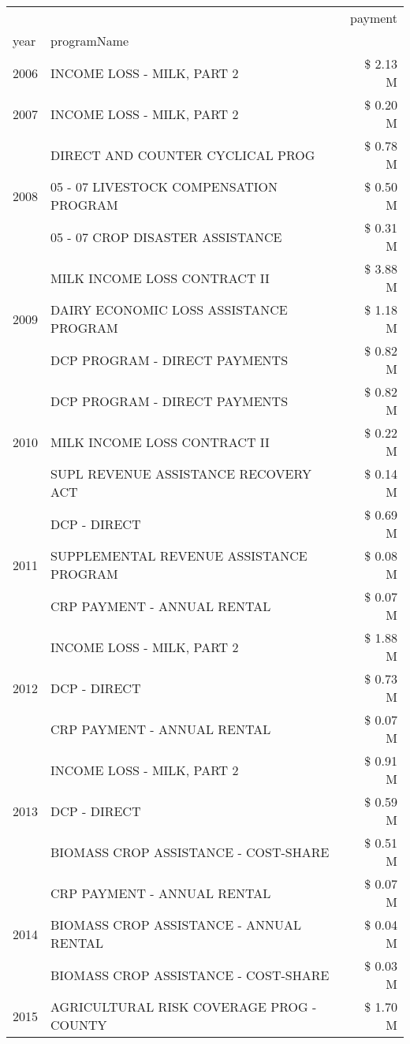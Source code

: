 \begin{tabular}{llr}
\toprule
 &  & payment \\
year & programName &  \\
\midrule
2006 & INCOME LOSS - MILK, PART 2 & \$ 2.13 M \\
\cline{1-3}
2007 & INCOME LOSS - MILK, PART 2 & \$ 0.20 M \\
\cline{1-3}
\multirow[t]{3}{*}{2008} & DIRECT AND COUNTER CYCLICAL PROG & \$ 0.78 M \\
 & 05 - 07 LIVESTOCK COMPENSATION PROGRAM & \$ 0.50 M \\
 & 05 - 07 CROP DISASTER ASSISTANCE & \$ 0.31 M \\
\cline{1-3}
\multirow[t]{3}{*}{2009} & MILK INCOME LOSS CONTRACT II & \$ 3.88 M \\
 & DAIRY ECONOMIC LOSS ASSISTANCE PROGRAM & \$ 1.18 M \\
 & DCP PROGRAM - DIRECT PAYMENTS & \$ 0.82 M \\
\cline{1-3}
\multirow[t]{3}{*}{2010} & DCP PROGRAM - DIRECT PAYMENTS & \$ 0.82 M \\
 & MILK INCOME LOSS CONTRACT II & \$ 0.22 M \\
 & SUPL REVENUE ASSISTANCE RECOVERY ACT & \$ 0.14 M \\
\cline{1-3}
\multirow[t]{3}{*}{2011} & DCP - DIRECT & \$ 0.69 M \\
 & SUPPLEMENTAL REVENUE ASSISTANCE PROGRAM & \$ 0.08 M \\
 & CRP PAYMENT - ANNUAL RENTAL & \$ 0.07 M \\
\cline{1-3}
\multirow[t]{3}{*}{2012} & INCOME LOSS - MILK, PART 2 & \$ 1.88 M \\
 & DCP - DIRECT & \$ 0.73 M \\
 & CRP PAYMENT - ANNUAL RENTAL & \$ 0.07 M \\
\cline{1-3}
\multirow[t]{3}{*}{2013} & INCOME LOSS - MILK, PART 2 & \$ 0.91 M \\
 & DCP - DIRECT & \$ 0.59 M \\
 & BIOMASS CROP ASSISTANCE - COST-SHARE & \$ 0.51 M \\
\cline{1-3}
\multirow[t]{3}{*}{2014} & CRP PAYMENT - ANNUAL RENTAL & \$ 0.07 M \\
 & BIOMASS CROP ASSISTANCE - ANNUAL RENTAL & \$ 0.04 M \\
 & BIOMASS CROP ASSISTANCE - COST-SHARE & \$ 0.03 M \\
\cline{1-3}
\multirow[t]{3}{*}{2015} & AGRICULTURAL RISK COVERAGE PROG - COUNTY & \$ 1.70 M \\

\end{tabular}
